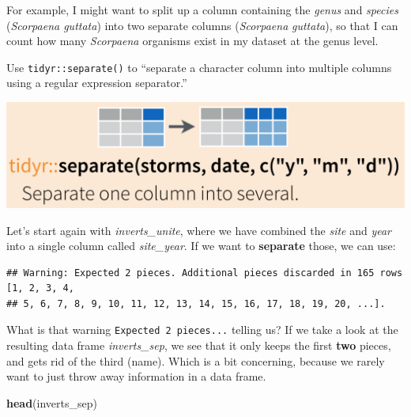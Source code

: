 \documentclass[]{book}
\newenvironment{Shaded}{\begin{snugshade}}{\end{snugshade}}
\newcommand{\DataTypeTok}[1]{\textcolor[rgb]{0.13,0.29,0.53}{#1}}
\newcommand{\KeywordTok}[1]{\textcolor[rgb]{0.13,0.29,0.53}{\textbf{#1}}}
\newcommand{\NormalTok}[1]{#1}
\newcommand{\OperatorTok}[1]{\textcolor[rgb]{0.81,0.36,0.00}{\textbf{#1}}}
\newcommand{\StringTok}[1]{\textcolor[rgb]{0.31,0.60,0.02}{#1}}
\begin{document}
For example, I might want to split up a column containing the \emph{genus} and \emph{species} (\emph{Scorpaena guttata}) into two separate columns (\emph{Scorpaena} \textbar{} \emph{guttata}), so that I can count how many \emph{Scorpaena} organisms exist in my dataset at the genus level.

Use \texttt{tidyr::separate()} to ``separate a character column into multiple columns using a regular expression separator.''

\includegraphics{img/rstudio-cheatsheet-separate.png}

Let's start again with \emph{inverts\_unite}, where we have combined the \emph{site} and \emph{year} into a single column called \emph{site\_year}. If we want to \textbf{separate} those, we can use:

\begin{Shaded}
\end{Shaded}

\begin{verbatim}
## Warning: Expected 2 pieces. Additional pieces discarded in 165 rows [1, 2, 3, 4,
## 5, 6, 7, 8, 9, 10, 11, 12, 13, 14, 15, 16, 17, 18, 19, 20, ...].
\end{verbatim}

What is that warning \texttt{Expected\ 2\ pieces...} telling us? If we take a look at the resulting data frame \emph{inverts\_sep}, we see that it only keeps the first \textbf{two} pieces, and gets rid of the third (name). Which is a bit concerning, because we rarely want to just throw away information in a data frame.

\begin{Shaded}
\begin{Highlighting}[]
\KeywordTok{head}\NormalTok{(inverts_sep)}
\end{Highlighting}
\end{Shaded}
\end{document}

